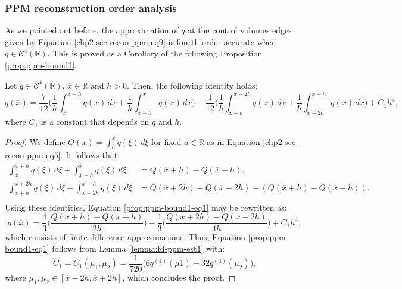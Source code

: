 \subsubsection{PPM reconstruction order analysis}
\label{chp2-sec-numerical-analysis}
As we pointed out before, the approximation of $q$ at the control volumes edges
given by Equation \eqref{chp2-sec-recon-ppm-eq9} is fourth-order accurate when $q \in \mathcal{C}^4(\mathbb{R})$. 
This is proved as a Corollary of the following Proposition \ref{prop:ppm-bound1}.
\begin{prop}
	\label{prop:ppm-bound1}
	Let $q \in \mathcal{C}^{4}(\mathbb{R})$, $\overline{x} \in \mathbb{R} $ and $h>0$.
	Then, the following identity holds:
	\begin{equation}
		\label{prop:ppm-bound1-eq1}
		q(\overline{x} ) = \frac{7}{12}\bigg( \frac{1}{h} \int_{\overline{x} }^{\overline{x}+h} q(x) \,dx 
		       + \frac{1}{h} \int_{\overline{x} -h}^{\overline{x} } q(x) \,dx  \bigg)
		       - \frac{1}{12}\bigg( \frac{1}{h} \int_{\overline{x} +h}^{\overline{x}+2h} q(x) \,dx 
		       + \frac{1}{h} \int_{\overline{x} -2h}^{\overline{x} -h} q(x) \,dx  \bigg) + C_1h^4,
	\end{equation}
	where $C_1$ is a constant that depends on $q$ and $h$.
\end{prop}
\begin{proof}
	We define $Q(x) = \int_{a}^{x} q(\xi) \,d\xi$ for fixed $a \in \mathbb{R}$ as in 
	Equation \eqref{chp2-sec-recon-ppm-eq5}. It follows that:
	\begin{align*}
		\int_{\overline{x}}^{\overline{x}+h} q(\xi) \,d\xi + \int_{\overline{x}-h}^{\overline{x}} q(\xi) \,d\xi &=
		Q(\overline{x}+h) - Q(\overline{x}-h), \\
		\int_{\overline{x}+h}^{\overline{x}+2h} q(\xi) \,d\xi + \int_{\overline{x}-2h}^{\overline{x}-h} q(\xi) \,d\xi &=
		Q(\overline{x}+2h) - Q(\overline{x}-2h) - (Q(\overline{x}+h) - Q(\overline{x}-h)). \\
	\end{align*}
	Using these identities, Equation \eqref{prop:ppm-bound1-eq1} may be rewritten as:
	\begin{equation}
		\label{prop:ppm-bound1-eq2}
		q(\overline{x}) = \frac{4}{3} \bigg(\frac{Q(\overline{x}+h) - Q(\overline{x}-h)}{2h}\bigg)
		       - \frac{1}{3} \bigg(\frac{Q(\overline{x}+2h) - Q(\overline{x}-2h)}{4h}\bigg) + C_1h^4,
	\end{equation}
	which consists of finite-difference approximations. 
	Thus, Equation \eqref{prop:ppm-bound1-eq1} follows from Lemma \ref{lemma:fd-ppm-est1}
	with:
	\begin{equation}
		\label{prop:ppm-bound1-eq3}
		C_1 = C_1(\mu_1,\mu_2) = \frac{1}{720}\bigg(6q^{(4)}(\mu{1}) -32q^{(4)}(\mu_{2})\bigg), 
	\end{equation}
	where $\mu_{1}, \mu_{2} \in [\overline{x}-2h,\overline{x}+2h]$,
	which concludes the proof.
\end{proof}
